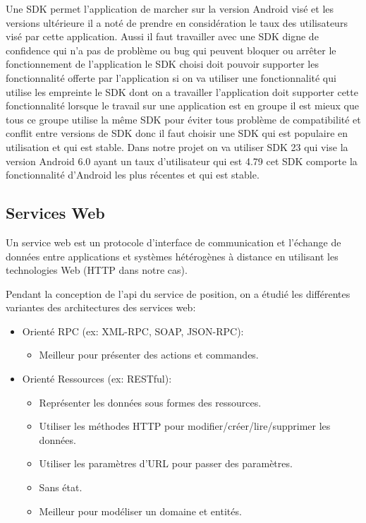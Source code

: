 Une SDK permet l'application de marcher sur la version Android visé et les
versions ultérieure il a noté de prendre en considération le taux des
utilisateurs visé par cette application. Aussi il faut travailler avec une SDK
digne de confidence qui n'a pas de problème ou bug qui peuvent bloquer ou
arrêter le fonctionnement de l'application le SDK choisi doit pouvoir supporter
les fonctionnalité offerte par l'application si on va utiliser une
fonctionnalité qui utilise les empreinte le SDK dont on a travailler
l'application doit supporter cette fonctionnalité lorsque le travail sur une
application est en groupe il est mieux que tous ce groupe utilise la même SDK
pour éviter tous problème de compatibilité et conflit entre versions de SDK
donc il faut choisir une SDK qui est populaire en utilisation et qui est
stable. Dans notre projet on va utiliser SDK 23 qui vise la version Android 6.0
ayant un taux d'utilisateur qui est 4.79 %
cet SDK comporte la fonctionnalité d'Android les plus récentes et qui est
stable.

\subsection{Services Web}

Un service web est un protocole d'interface de communication et l'échange de
données entre applications et systèmes hétérogènes à distance en utilisant les
technologies Web (HTTP dans notre cas).

Pendant la conception de l'api du service de position, on a étudié les
différentes variantes des architectures des services web:

\begin{itemize}
    \item Orienté RPC (ex: XML-RPC, SOAP, JSON-RPC):
        \begin{itemize}
            \item Meilleur pour présenter des actions et commandes.
        \end{itemize}
    \item Orienté Ressources (ex: RESTful):
        \begin{itemize}
            \item Représenter les données sous formes des ressources.
            \item Utiliser les méthodes HTTP pour modifier/créer/lire/supprimer
                les données.
            \item Utiliser les paramètres d'URL pour passer des paramètres.
            \item Sans état.
            \item Meilleur pour modéliser un domaine et entités.
        \end{itemize}
\end{itemize}

